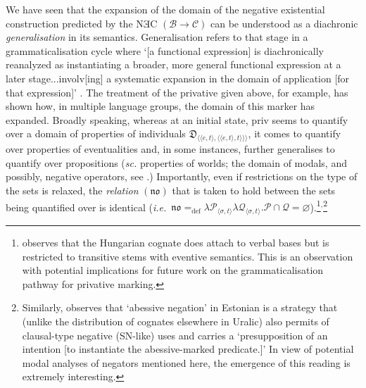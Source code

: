 We have seen that the expansion of the domain of the negative existential construction predicted by the NƎC $(\mathcal{B\to C})$ can be understood as a diachronic \textit{generalisation} in its semantics. Generalisation refers to that stage in a grammaticalisation cycle where `[a functional expression] is diachronically reanalyzed as instantiating a broader, more general functional expression at a later stage...involv[ing] a systematic expansion in the domain of application [for that expression]' \citep[187]{Deo2015}. The treatment of the privative given above, for example, has shown how, in multiple language groups, the domain of this marker has expanded. Broadly speaking, whereas at an initial state, \gls{priv} seems to quantify over a domain of properties of individuals $\mathfrak D_{\langle\langle e,t\rangle ,\langle\langle e,t\rangle,t\rangle\rangle\rangle}$, it comes to quantify over properties of eventualities and, in some instances, further generalises to quantify over propositions  (\textit{sc.} properties of worlds; the domain of modals, and possibly, negative operators, see \citealt[34\textit{ff}]{Horn2017}.) Importantly, even if restrictions on the type of the sets is relaxed, the \textit{relation} $(\boldsymbol{\mathfrak{n\!o}})$ that is taken to hold between the sets being quantified over is identical (\textit{i.e.}~$\mathfrak{no}=_{\text{def}}\lambda \mathcal P_{\langle\sigma,t\rangle}\lambda \mathcal Q_{\langle\sigma,t\rangle}.\mathcal P\cap \mathcal Q=\varnothing$).\footnote{
	\citet[609]{Kiefer2015} observes that the Hungarian cognate does attach to verbal bases but is restricted to transitive stems with eventive semantics. This is an observation with potential implications for future work on the grammaticalisation pathway for privative marking.}$^,$\footnote{\label{TammABE}Similarly, \citet[416]{Tamm2015} observes that `abessive negation' in Estonian is a strategy that (unlike the distribution of cognates elsewhere in Uralic) also permits of clausal-type negative (SN-like) uses and carries a `presupposition of an intention [to instantiate the abessive-marked predicate.]' In view of potential modal analyses of negators mentioned here, the emergence of this reading is extremely interesting.}%

